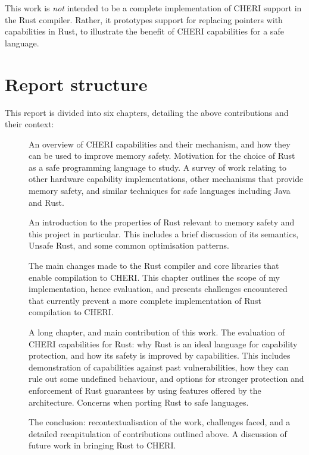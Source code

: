 \documentclass[dissertation.tex]{subfiles}
\begin{document}
This work is \emph{not} intended to be a complete implementation of
CHERI support in the Rust compiler.
Rather, it prototypes support for replacing pointers with capabilities
in Rust, to illustrate the benefit of CHERI capabilities for a safe
language.


\section{Report structure}
This report is divided into six chapters, detailing the above
contributions and their context:

\begin{description}
    \item[]
    An overview of CHERI capabilities and their mechanism, and how they
    can be used to improve memory safety.
    Motivation for the choice of Rust as a safe programming language to
    study.
    A survey of work relating to other hardware capability
    implementations, other mechanisms that provide memory safety, and
    similar techniques for safe languages including Java and Rust.
    \item[]
    An introduction to the properties of Rust relevant to
    memory safety and this project in particular.
    This includes a brief discussion of its semantics, Unsafe Rust, and
    some common optimisation patterns.
    \item[]
    The main changes made to the Rust compiler and core libraries that
    enable compilation to CHERI.
    This chapter outlines the scope of my implementation, hence
    evaluation, and presents challenges encountered that currently
    prevent a more complete implementation of Rust compilation to CHERI.
    \item[]
    A long chapter, and main contribution of this work.
    The evaluation of CHERI capabilities for Rust: why Rust is an ideal
    language for capability protection, and how its safety is improved
    by capabilities.
    This includes demonstration of capabilities against past
    vulnerabilities, how they can rule out some undefined behaviour, and
    options for stronger protection and enforcement of Rust guarantees
    by using features offered by the architecture.
    Concerns when porting Rust to safe languages.
    \item[]
    The conclusion: recontextualisation of the work, challenges faced,
    and a detailed recapitulation of contributions outlined above.
    A discussion of future work in bringing Rust to CHERI.
\end{description}
\end{document}
